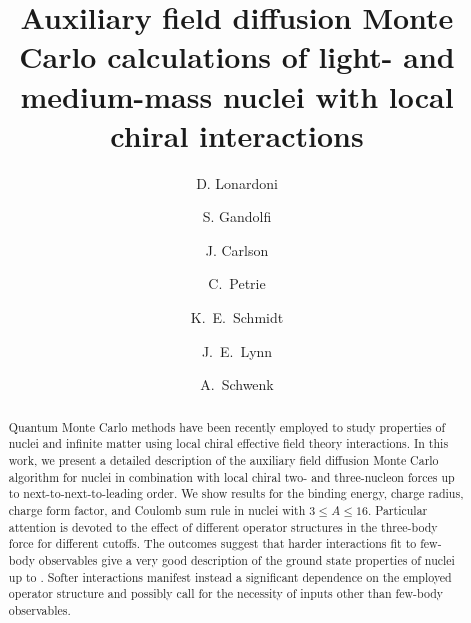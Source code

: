 \documentclass[aps,prc,twocolumn,superscriptaddress,floatfix]{revtex4-1}
\begin{document}
\title{Auxiliary field diffusion Monte Carlo calculations of light- and medium-mass nuclei with local chiral interactions}

\author{D. Lonardoni}

\author{S. Gandolfi}
\author{J. Carlson}

\author{C.~Petrie}
\author{K.~E.~Schmidt}

\author{J.~E.~Lynn}

\author{A.~Schwenk}


\begin{abstract}
Quantum Monte Carlo methods have been recently employed to study properties
of nuclei and infinite matter using local chiral effective field theory 
interactions. In this work, we present a detailed description of the
auxiliary field diffusion Monte Carlo algorithm for nuclei in combination 
with local chiral two- and three-nucleon forces up to 
next-to-next-to-leading order. We show results for the binding energy, 
charge radius, charge form factor, and Coulomb sum rule in nuclei with
$3\le A\le16$. Particular attention is devoted to the effect 
of different operator structures in the three-body force for different cutoffs. 
The outcomes suggest that harder interactions fit to few-body observables
give a very good description of the ground state properties of nuclei up to
. Softer interactions manifest instead a significant dependence 
on the employed operator structure and possibly call for the necessity of 
inputs other than few-body observables.
\end{abstract}
\end{document}
